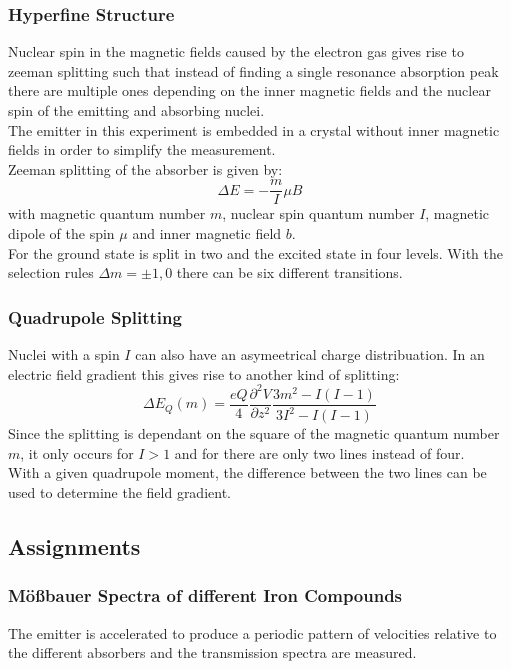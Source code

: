 \subsubsection{Hyperfine Structure}
Nuclear spin in the magnetic fields caused by the electron gas gives rise to zeeman splitting such that instead of finding a single resonance absorption peak there are multiple ones depending on the inner magnetic fields and the nuclear spin of the emitting and absorbing nuclei.\\
The  emitter in this experiment is embedded in a crystal without inner magnetic fields in order to simplify the measurement.\\
Zeeman splitting of the absorber is given by:
$$\Delta E = - \frac{m}{I} \mu B$$
with magnetic quantum number $m$, nuclear spin quantum number $I$, magnetic dipole of the spin $\mu$ and inner magnetic field $b$.\\
For  the ground state is split in two and the excited state in four levels. With the selection rules $\Delta m = \pm 1, 0$ there can be six different transitions.

\subsubsection{Quadrupole Splitting}
Nuclei with a spin $I$ can also have an asymeetrical charge distribuation. In an electric field gradient this gives rise to another kind of splitting:
$$\Delta E_Q (m) = \frac{eQ}{4} \frac{\partial^2 V}{\partial z^2} \frac{3m^2 - I(I-1)}{3I^2 - I(I-1)}$$
Since the splitting is dependant on the square of the magnetic quantum number $m$, it only occurs for $I > 1$ and for  there are only two lines instead of four.\\
With a given quadrupole moment, the difference between the two lines can be used to determine the field gradient.


\subsection{Assignments}

\subsubsection{Mößbauer Spectra of different Iron Compounds}
The emitter is accelerated to produce a periodic pattern of velocities relative to the different absorbers and the transmission spectra are measured.


